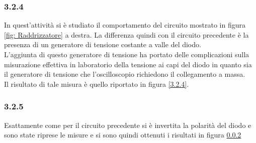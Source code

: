 \subsubsection{3.2.4}
In quest'attività si è studiato il comportamento del circuito mostrato in figura \ref{fig: Raddrizzatore} a destra.
La differenza quindi con il circuito precedente è la presenza di un generatore di tensione costante a valle del diodo.\\
L'aggiunta di questo generatore di tensione ha portato delle complicazioni sulla misurazione effettiva in laboratorio della tensione ai capi del diodo in quanto sia il generatore di tensione che l'oscilloscopio richiedono il collegamento a massa.\\
Il risultato di tale misura è quello riportato in figura \ref{3.2.4}.
\subsubsection{3.2.5}
Esattamente come per il circuito precedente si è invertita la polarità del diodo e sono state riprese le misure e si sono quindi ottenuti i risultati in figura \ref{}

